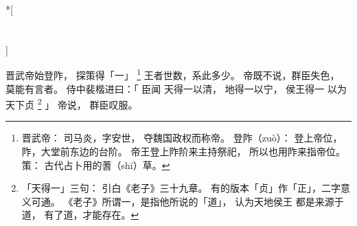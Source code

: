 
\switchcolumn[0]*[\section{}]

晋武帝始登阼，
探策得「一」%
\footnote{%
    晋武帝：
        司马炎，字安世，
        夺魏国政权而称帝。
    登阼（zuò）：
        登上帝位，
        阼，大堂前东边的台阶。
        帝王登上阼阶来主持祭祀，
        所以也用阼来指帝位。
    策：
        古代占卜用的蓍（shī）草。
}%
王者世数，系此多少。
帝既不说，群臣失色，
莫能有言者。
侍中裴楷进曰：「
    臣闻
    天得一以清，
    地得一以宁，
    侯王得一
    以为天下贞%
    \footnote{%
        「天得一」三句：
            引白《老子》三十九章。
            有的版本「贞」作「正」，二字意义可通。
            《老子》所谓一，是指他所说的「道」，
            认为天地侯王
            都是来源于道，
            有了道，才能存在。
    }%
」
帝说，
群臣叹服。

\switchcolumn



